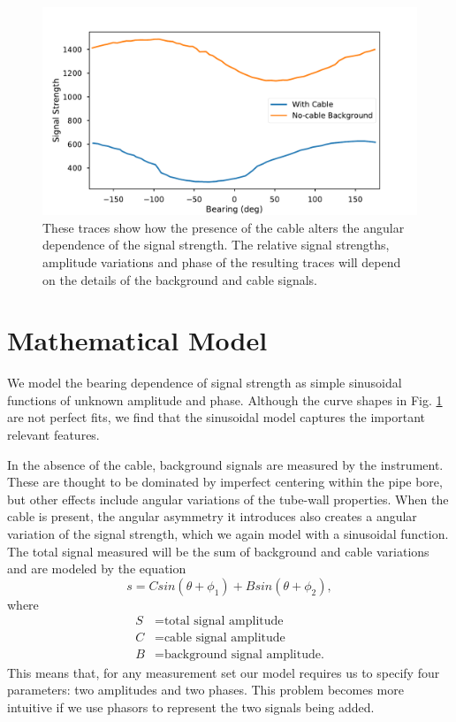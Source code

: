 \documentclass[paper=a4, fontsize=11pt]{scrartcl}
\numberwithin{equation}{section}		%
\numberwithin{figure}{section}			%
\numberwithin{table}{section}				%
\begin{document}
\begin{figure}[h!]
  \caption{These traces show how the presence of the cable alters the angular dependence of the signal strength.  The relative signal strengths, amplitude variations and phase of the resulting traces will depend on the details of the background and cable signals.}
  \label{fig:sample_bearing_trace}
  \centering
  \includegraphics[width=1.0\textwidth]{figures/sample_bearing_trace.pdf}
\end{figure}

\section{Mathematical Model}
We model the bearing dependence of signal strength as simple sinusoidal functions of unknown amplitude and phase.  Although the curve shapes in Fig. \ref{fig:sample_bearing_trace} are not perfect fits, we find that the sinusoidal model captures the important relevant features.
\par In the absence of the cable, background signals are measured by the instrument.  These are thought to be dominated by imperfect centering within the pipe bore, but other effects include angular variations of the tube-wall properties.  When the cable is present, the angular asymmetry it introduces also creates a angular variation of the signal strength, which we again model with a sinusoidal function.  The total signal measured will be the sum of background and cable variations and are modeled by the equation
\begin{equation} \label{eq:trig_sig}
    s = C sin\left(\theta + \phi_1\right) + B sin\left(\theta + \phi_2\right),
\end{equation}
where
\begin{align}
        S &= \text{total signal amplitude} \\
        C &= \text{cable signal amplitude} \\
        B &= \text{background signal amplitude.}
\end{align}
This means that, for any measurement set our model requires us to specify four parameters: two amplitudes and two phases.  This problem becomes more intuitive if we use phasors to represent the two signals being added.
\end{document}
